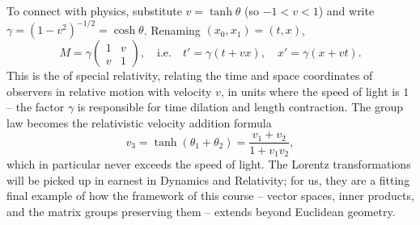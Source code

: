 \documentclass[a4paper]{scrartcl}
\begin{document}
To connect with physics, substitute $v = \tanh \theta$ (so $-1 < v < 1$) and write $\gamma = (1 - v^2)^{-1/2} = \cosh\theta$. Renaming $(x_0, x_1) = (t, x)$,
$$
M = \gamma\begin{pmatrix}
	1 & v \\ v & 1
\end{pmatrix},
\quad \text{i.e.} \quad
t' = \gamma(t + vx), \quad x' = \gamma(x + vt).
$$
This is the  of special relativity, relating the time and space coordinates of observers in relative motion with velocity $v$, in units where the speed of light is $1$ -- the factor $\gamma$ is responsible for time dilation and length contraction. The group law becomes the relativistic velocity addition formula
$$
v_3 = \tanh(\theta_1 + \theta_2) = \frac{v_1 + v_2}{1 + v_1v_2},
$$
which in particular never exceeds the speed of light. The Lorentz transformations will be picked up in earnest in Dynamics and Relativity; for us, they are a fitting final example of how the framework of this course -- vector spaces, inner products, and the matrix groups preserving them -- extends beyond Euclidean geometry.
\end{document}
